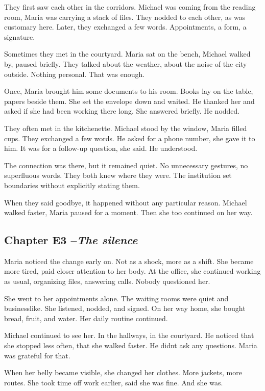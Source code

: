 \documentclass[
]{article}
\begin{document}
They first saw each other in the corridors. Michael was coming from the reading room, Maria was carrying a stack of files. They nodded to each other, as was customary here. Later, they exchanged a few words. Appointments, a form, a signature.

Sometimes they met in the courtyard. Maria sat on the bench, Michael walked by, paused briefly. They talked about the weather, about the noise of the city outside. Nothing personal. That was enough.

Once, Maria brought him some documents to his room. Books lay on the table, papers beside them. She set the envelope down and waited. He thanked her and asked if she had been working there long. She answered briefly. He nodded.

They often met in the kitchenette. Michael stood by the window, Maria filled cups. They exchanged a few words. He asked for a phone number, she gave it to him. It was for a follow-up question, she said. He understood.

The connection was there, but it remained quiet. No unnecessary gestures, no superfluous words. They both knew where they were. The institution set boundaries without explicitly stating them.

When they said goodbye, it happened without any particular reason. Michael walked faster, Maria paused for a moment. Then she too continued on her way.

\subsection{\texorpdfstring{Chapter E3 --\emph{The silence}}{Chapter E3 --The silence}}\label{chapter-e3-the-silence}

Maria noticed the change early on. Not as a shock, more as a shift. She became more tired, paid closer attention to her body. At the office, she continued working as usual, organizing files, answering calls. Nobody questioned her.

She went to her appointments alone. The waiting rooms were quiet and businesslike. She listened, nodded, and signed. On her way home, she bought bread, fruit, and water. Her daily routine continued.

Michael continued to see her. In the hallways, in the courtyard. He noticed that she stopped less often, that she walked faster. He didn\textquotesingle t ask any questions. Maria was grateful for that.

When her belly became visible, she changed her clothes. More jackets, more routes. She took time off work earlier, said she was fine. And she was.
\end{document}

